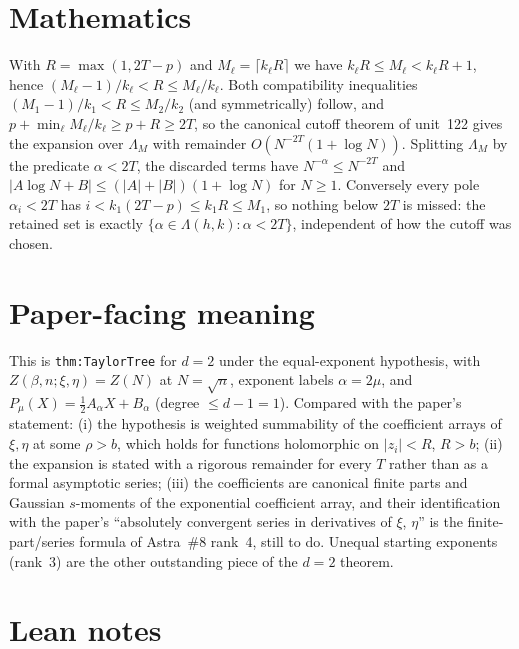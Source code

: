 \documentclass[11pt]{article}
\begin{document}
\section{Mathematics}

With $R=\max(1,2T-p)$ and $M_\ell=\lceil k_\ell R\rceil$ we have $k_\ell R\le M_\ell<k_\ell R+1$,
hence $(M_\ell-1)/k_\ell<R\le M_\ell/k_\ell$. Both compatibility inequalities
$(M_1-1)/k_1<R\le M_2/k_2$ (and symmetrically) follow, and
$p+\min_\ell M_\ell/k_\ell\ge p+R\ge2T$, so the canonical cutoff theorem of unit~122 gives the
expansion over $\Lambda_M$ with remainder $O(N^{-2T}(1+\log N))$. Splitting $\Lambda_M$ by the
predicate $\alpha<2T$, the discarded terms have $N^{-\alpha}\le N^{-2T}$ and
$|A\log N+B|\le(|A|+|B|)(1+\log N)$ for $N\ge1$. Conversely every pole $\alpha_i<2T$ has
$i<k_1(2T-p)\le k_1R\le M_1$, so nothing below $2T$ is missed: the retained set is exactly
$\{\alpha\in\Lambda(h,k):\alpha<2T\}$, independent of how the cutoff was chosen.

\section{Paper-facing meaning}

This is \texttt{thm:TaylorTree} for $d=2$ under the equal-exponent hypothesis, with
$Z(\beta,n;\xi,\eta)=Z(N)$ at $N=\sqrt n$, exponent labels $\alpha=2\mu$, and
$P_\mu(X)=\tfrac12A_\alpha X+B_\alpha$ (degree $\le d-1=1$). Compared with the paper's statement:
(i) the hypothesis is weighted summability of the coefficient arrays of $\xi,\eta$ at some
$\rho>b$, which holds for functions holomorphic on $|z_i|<R$, $R>b$; (ii) the expansion is stated
with a rigorous remainder for every $T$ rather than as a formal asymptotic series; (iii) the
coefficients are canonical finite parts and Gaussian $s$-moments of the exponential coefficient
array, and their identification with the paper's ``absolutely convergent series in derivatives of
$\xi$, $\eta$'' is the finite-part/series formula of Astra~\#8 rank~4, still to do. Unequal starting
exponents (rank~3) are the other outstanding piece of the $d=2$ theorem.

\section{Lean notes}
\end{document}
